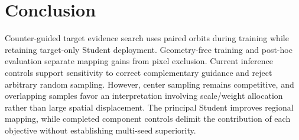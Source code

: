 \section{Conclusion}
\label{sec:conclusion}
Counter-guided target evidence search uses paired orbits during training while retaining target-only Student deployment. Geometry-free training and post-hoc evaluation separate mapping gains from pixel exclusion. Current inference controls support sensitivity to correct complementary guidance and reject arbitrary random sampling. However, center sampling remains competitive, and overlapping samples favor an interpretation involving scale/weight allocation rather than large spatial displacement. The principal Student improves regional mapping, while completed component controls delimit the contribution of each objective without establishing multi-seed superiority.

